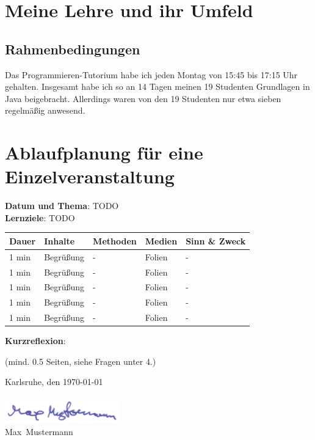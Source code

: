 \documentclass[a4paper,12pt]{article}
\newcommand{\Jahr}{2012 / 2013}         %
\newcommand{\Semester}{Wintersemester}  %
\newcommand{\Datum}{\today}             %
\newcommand{\Ort}{Karlsruhe}
\newcommand{\Vorname}{Max}
\newcommand{\Nachname}{Mustermann}
\begin{document}
 
 \setcounter{page}{2}


\section*{Meine Lehre und ihr Umfeld}
\subsection*{Rahmenbedingungen}
Das Programmieren-Tutorium habe ich jeden Montag von 15:45 bis 17:15 
Uhr gehalten. Insgesamt habe ich so an 14 Tagen meinen 19 Studenten 
Grundlagen in Java beigebracht. Allerdings waren von den 19 Studenten
nur etwa sieben regelmäßig anwesend.\\

\clearpage
\section*{Ablaufplanung für eine Einzelveranstaltung}
\textbf{Datum und Thema}: TODO\\
\textbf{Lernziele}: TODO\\

\begin{tabularx}{\textwidth}{@{}llllX}
Dauer   & Inhalte   & Methoden  & Medien    & Sinn \& Zweck\\
\hline
1 min   & Begrüßung &   -       & Folien    & -\\
1 min   & Begrüßung &   -       & Folien    & -\\
1 min   & Begrüßung &   -       & Folien    & -\\
1 min   & Begrüßung &   -       & Folien    & -\\
1 min   & Begrüßung &   -       & Folien    & -\\
\end{tabularx}

\textbf{Kurzreflexion}:

(mind. 0.5 Seiten, siehe Fragen unter 4.)

\noindent \Ort, den \Datum\\
\\
\includegraphics[height=10mm]{max-mustermann.pdf}\\
\Vorname~\Nachname
\end{document}
